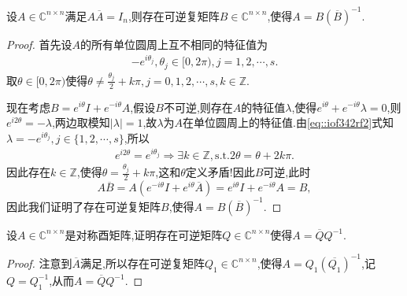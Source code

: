 \documentclass[../../main.tex]{subfiles}%
\begin{document}
\begin{theorem}\label{theorem:定理1354846135}
设\( A \in \mathbb{C}^{n \times n} \)满足\( A \overline{A} = I_n \),则存在可逆复矩阵\( B \in \mathbb{C}^{n \times n} \),使得\( A = B (\overline{B})^{-1} \).
\end{theorem}
\begin{proof}

首先设\( A \)的所有单位圆周上互不相同的特征值为
\begin{align}
-e^{i\theta_j}, \theta_j \in [0, 2\pi), j = 1, 2, \cdots, s.\label{eq::iof342rf2}
\end{align}
取\( \theta \in [0, 2\pi) \)使得\( \theta \neq \frac{\theta_j}{2} + k\pi, j = 0, 1, 2, \cdots, s, k \in \mathbb{Z} \).

现在考虑\( B = e^{i\theta} I + e^{-i\theta} A \),假设$B$不可逆,则存在\( A \)的特征值\( \lambda \),使得\( e^{i\theta} + e^{-i\theta} \lambda = 0 \),则\( e^{i2\theta} = -\lambda \),两边取模知$|\lambda|=1$,故$\lambda$为$A$在单位圆周上的特征值.由\eqref{eq::iof342rf2}式知\( \lambda = -e^{i\theta_j}, j \in \{1, 2, \cdots, s\} \),所以
\begin{align}
e^{i2\theta}=e^{i\theta_j}\Longrightarrow \exists k\in \mathbb{Z},\mathrm{s}.\mathrm{t}.  2\theta=\theta + 2k\pi.
\end{align}
因此存在\( k \in \mathbb{Z} \),使得\( \theta = \frac{\theta_j}{2} + k\pi \),这和\( \theta \)定义矛盾!因此\( B \)可逆,此时
\[
A \overline{B} = A \left( e^{-i\theta} I + e^{i\theta} \overline{A} \right) = e^{i\theta} I + e^{-i\theta} A = B,
\]
因此我们证明了存在可逆复矩阵\( B \),使得\( A = B (\overline{B})^{-1} \).

\end{proof}

\begin{proposition}
设\( A \in \mathbb{C}^{n \times n} \)是对称酉矩阵,证明存在可逆矩阵\( Q \in \mathbb{C}^{n \times n} \)使得\( A = \overline{Q} Q^{-1} \).
\end{proposition}
\begin{proof}

注意到\( \overline{A} \)满足,所以存在可逆复矩阵\( Q_1 \in \mathbb{C}^{n \times n} \),使得\( A = Q_1 (\overline{Q_1})^{-1} \),记$Q=Q_1^{-1}$,从而\( A = \overline{Q} Q^{-1} \).

\end{proof}
\end{document}
